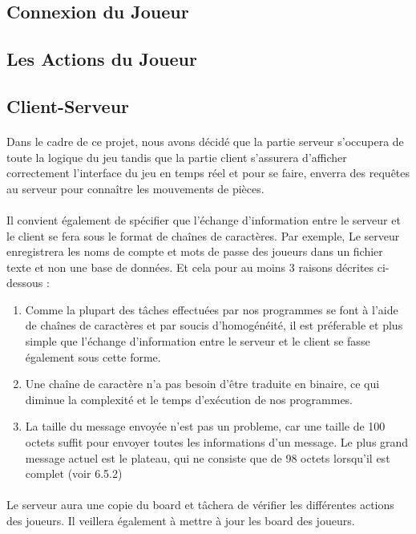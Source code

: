 \documentclass[10pt, a4paper]{article}
\begin{document}
\newpage

\subsection{Connexion du Joueur}

\subsection{Les Actions du Joueur}

\subsection{Client-Serveur}
\paragraph{}Dans le cadre de ce projet, nous avons décidé que la partie serveur s'occupera de toute la logique du jeu tandis que la partie client s'assurera d'afficher correctement l'interface du jeu en temps réel et pour se faire, enverra des requêtes au serveur pour connaître les mouvements de pièces.
\paragraph{}Il convient également de spécifier que l'échange d'information entre le serveur et le client se fera sous le format de chaînes de caractères. Par exemple, Le serveur enregistrera les noms de compte et mots de passe des joueurs dans un fichier texte et non une base de données. Et cela pour au moins 3 raisons décrites ci-dessous : 
\begin{enumerate}
\item Comme la plupart des tâches effectuées par nos programmes se font à l'aide de chaînes de caractères et par soucis d'homogénéité, il est préferable et plus simple que l'échange d'information entre le serveur et le client se fasse également sous cette forme.
\item Une chaîne de caractère n'a pas besoin d'être traduite en binaire, ce qui diminue la complexité et le temps d'exécution de nos programmes.
\item La taille du message envoyée n'est pas un probleme, car une taille de 100 octets suffit pour envoyer toutes les informations d'un message. Le plus grand message actuel est le plateau, qui ne consiste que de 98 octets lorsqu'il est complet (voir 6.5.2)
\end{enumerate}
\paragraph{}Le serveur aura une copie du board et tâchera de vérifier les différentes actions des joueurs. Il veillera également à mettre à jour les board des joueurs.
\end{document}
